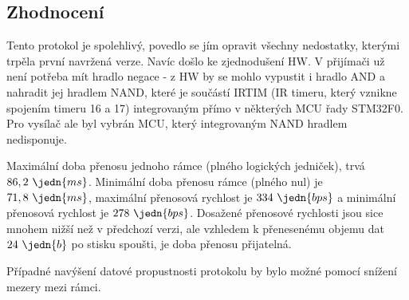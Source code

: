 \subsection{Zhodnocení}
Tento protokol je spolehlivý, povedlo se jím opravit všechny nedostatky, kterými trpěla první navržená verze. Navíc došlo ke zjednodušení HW. V přijímači už není potřeba mít hradlo negace - z HW by se mohlo vypustit i hradlo AND a nahradit jej hradlem NAND, které je součástí IRTIM (IR timeru, který vznikne spojením timeru 16 a 17) integrovaným přímo v některých MCU řady STM32F0. Pro vysílač ale byl vybrán MCU, který integrovaným NAND hradlem nedisponuje.

Maximální doba přenosu jednoho rámce (plného logických jedniček), trvá $86,2~\jedn{ms}$. Minimální doba přenosu rámce (plného nul) je $71,8~\jedn{ms}$, maximální přenosová rychlost je $334~\jedn{bps}$ a minimální přenosová rychlost je $278~\jedn{bps}$. Dosažené přenosové rychlosti jsou sice mnohem nižší než v předchozí verzi, ale vzhledem k přenesenému objemu dat $24~\jedn{b}$ po stisku spoušti, je doba přenosu přijatelná.

Případné navýšení datové propustnosti protokolu by bylo možné pomocí snížení mezery mezi rámci.

